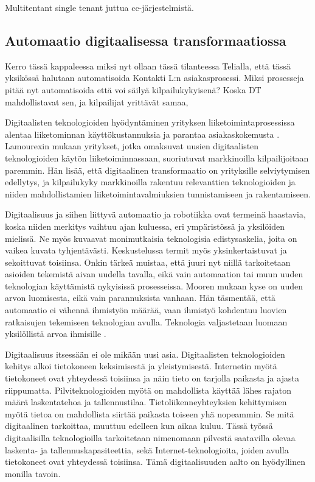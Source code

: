 \documentclass[finnish,12pt,a4paper,pdftex]{article}
\begin{document}
Multitentant single tenant juttua cc-järjestelmistä.

\subsection{Automaatio digitaalisessa transformaatiossa}
Kerro tässä kappaleessa miksi nyt ollaan tässä tilanteessa Telialla, että tässä yksikössä halutaan automatisoida Kontakti L:n asiakasprosessi. Miksi prosesseja pitää nyt automatisoida että voi säilyä kilpailukykyisenä? Koska DT mahdollistavat sen, ja kilpailijat yrittävät samaa, 

Digitaalisten teknologioiden hyödyntäminen yrityksen liiketoimintaprosessissa alentaa liiketominnan käyttökustannuksia ja parantaa asiakaskokemusta  \citep{lamoureux, jungner}. Lamourexin mukaan yritykset, jotka omaksuvat uusien digitaalisten teknologioiden käytön liiketoiminnassaan, suoriutuvat markkinoilla kilpailijoitaan paremmin. Hän lisää, että digitaalinen transformaatio on yrityksille selviytymisen edellytys, ja kilpailukyky markkinoilla rakentuu relevanttien teknologioiden ja niiden mahdollistamien liiketoimintavalmiuksien tunnistamiseen ja rakentamiseen. 

Digitaalisuus ja siihen liittyvä automaatio ja robotiikka ovat termeinä haastavia, koska niiden merkitys vaihtuu ajan kuluessa, eri ympäristössä ja yksilöiden mielissä. Ne myös kuvaavat monimutkaisia teknologisia edistysaskelia, joita on vaikea kuvata tyhjentävästi. Keskustelussa termit myös yksinkertaistuvat ja sekoittuvat toisiinsa. Onkin tärkeä muistaa, että juuri nyt niillä tarkoitetaan asioiden tekemistä aivan uudella tavalla, eikä vain automaation tai muun uuden teknologian käyttämistä nykyisissä prosesseissa. Mooren \citeyearpar{susanmoore} mukaan kyse on uuden arvon luomisesta, eikä vain parannuksista vanhaan. Hän täsmentää, että automaatio ei vähennä ihmistyön määrää, vaan ihmistyö kohdentuu luovien ratkaisujen tekemiseen teknologian avulla. Teknologia valjastetaan luomaan yksilöllistä arvoa ihmisille \citep{jungner, susanmoore}.

Digitaalisuus itsessään ei ole mikään uusi asia. Digitaalisten teknologioiden kehitys alkoi tietokoneen keksimisestä ja yleistymisestä. Internetin myötä tietokoneet ovat yhteydessä toisiinsa ja näin tieto on tarjolla paikasta ja ajasta riippumatta. Pilviteknologioiden myötä on mahdollista käyttää lähes rajaton määrä laskentatehoa ja tallennustilaa. Tietoliikenneyhteyksien kehittymisen myötä tietoa on mahdollista siirtää paikasta toiseen yhä nopeammin. Se mitä digitaalinen tarkoittaa, muuttuu edelleen kun aikaa kuluu. Tässä työssä digitaalisilla teknologioilla tarkoitetaan nimenomaan pilvestä saatavilla olevaa laskenta- ja tallennuskapasiteettia, sekä Internet-teknologioita, joiden avulla tietokoneet ovat yhteydessä toisiinsa. Tämä digitaalisuuden aalto on hyödyllinen monilla tavoin. 
\end{document}
